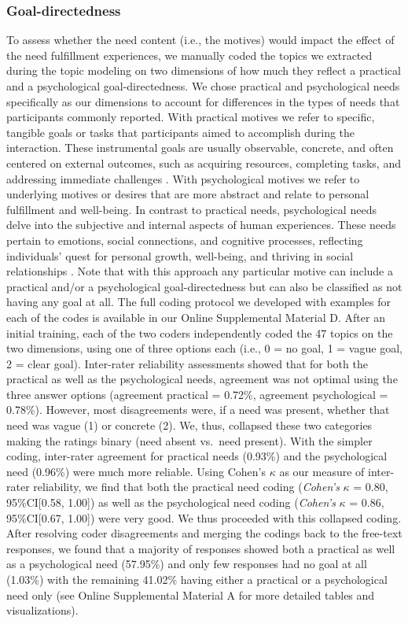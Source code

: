 \subsubsection{Goal-directedness}

To assess whether the need content (i.e., the motives) would impact the
effect of the need fulfillment experiences, we manually coded the topics
we extracted during the topic modeling on two dimensions of how much
they reflect a practical and a psychological goal-directedness. We chose
practical and psychological needs specifically as our dimensions to
account for differences in the types of needs that participants commonly
reported. With practical motives we refer to specific, tangible goals or
tasks that participants aimed to accomplish during the interaction.
These instrumental goals are usually observable, concrete, and often
centered on external outcomes, such as acquiring resources, completing
tasks, and addressing immediate challenges \citep[e.g.,][]{oduntan2019}.
With psychological motives we refer to underlying motives or desires
that are more abstract and relate to personal fulfillment and
well-being. In contrast to practical needs, psychological needs delve
into the subjective and internal aspects of human experiences. These
needs pertain to emotions, social connections, and cognitive processes,
reflecting individuals' quest for personal growth, well-being, and
thriving in social relationships \citep[][]{dweck2017}. Note that with
this approach any particular motive can include a practical and/or a
psychological goal-directedness but can also be classified as not having
any goal at all. The full coding protocol we developed with examples for
each of the codes is available in our Online Supplemental Material D.
After an initial training, each of the two coders independently coded
the 47 topics on the two dimensions, using one of three options each
(i.e., 0 = no goal, 1 = vague goal, 2 = clear goal). Inter-rater
reliability assessments showed that for both the practical as well as
the psychological needs, agreement was not optimal using the three
answer options (agreement practical = 0.72\%, agreement psychological =
0.78\%). However, most disagreements were, if a need was present,
whether that need was vague (1) or concrete (2). We, thus, collapsed
these two categories making the ratings binary (need absent vs.~need
present). With the simpler coding, inter-rater agreement for practical
needs (0.93\%) and the psychological need (0.96\%) were much more
reliable. Using Cohen's \(\kappa\) as our measure of inter-rater
reliability, we find that both the practical need coding
(\textit{Cohen's} \(\kappa\) = 0.80, 95\%CI{[}0.58, 1.00{]}) as well as
the psychological need coding (\textit{Cohen's} \(\kappa\) = 0.86,
95\%CI{[}0.67, 1.00{]}) were very good. We thus proceeded with this
collapsed coding. After resolving coder disagreements and merging the
codings back to the free-text responses, we found that a majority of
responses showed both a practical as well as a psychological need
(57.95\%) and only few responses had no goal at all (1.03\%) with the
remaining 41.02\% having either a practical or a psychological need only
(see Online Supplemental Material A for more detailed tables and
visualizations).

